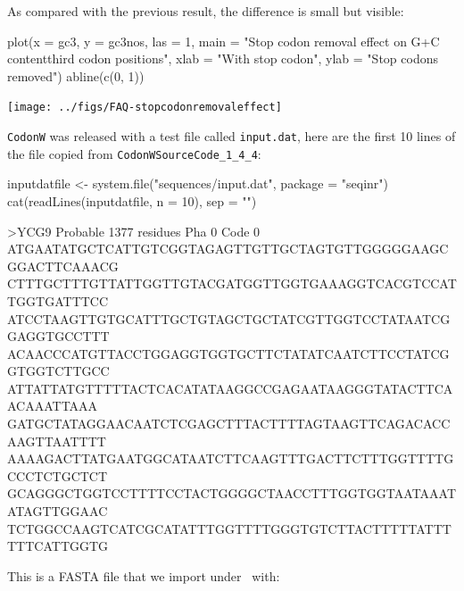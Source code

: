 \documentclass{article}
\begin{document}
As compared with the previous result, the difference is small but visible:

\begin{Schunk}
\begin{Sinput}
 plot(x = gc3, y = gc3nos, las = 1, main = "Stop codon removal effect on G+C content\nin third codon positions", 
     xlab = "With stop codon", ylab = "Stop codons removed")
 abline(c(0, 1))
\end{Sinput}
\end{Schunk}
\texttt{[image: ../figs/FAQ-stopcodonremovaleffect]}

\texttt{CodonW} was released with a test file called \texttt{input.dat}, here are
the first 10 lines of the file copied from \texttt{CodonWSourceCode\_1\_4\_4}:

\begin{Schunk}
\begin{Sinput}
 inputdatfile <- system.file("sequences/input.dat", package = "seqinr")
 cat(readLines(inputdatfile, n = 10), sep = "\n")
\end{Sinput}
\begin{Soutput}
>YCG9 Probable          1377 residues Pha 0 Code 0
ATGAATATGCTCATTGTCGGTAGAGTTGTTGCTAGTGTTGGGGGAAGCGGACTTCAAACG
CTTTGCTTTGTTATTGGTTGTACGATGGTTGGTGAAAGGTCACGTCCATTGGTGATTTCC
ATCCTAAGTTGTGCATTTGCTGTAGCTGCTATCGTTGGTCCTATAATCGGAGGTGCCTTT
ACAACCCATGTTACCTGGAGGTGGTGCTTCTATATCAATCTTCCTATCGGTGGTCTTGCC
ATTATTATGTTTTTACTCACATATAAGGCCGAGAATAAGGGTATACTTCAACAAATTAAA
GATGCTATAGGAACAATCTCGAGCTTTACTTTTAGTAAGTTCAGACACCAAGTTAATTTT
AAAAGACTTATGAATGGCATAATCTTCAAGTTTGACTTCTTTGGTTTTGCCCTCTGCTCT
GCAGGGCTGGTCCTTTTCCTACTGGGGCTAACCTTTGGTGGTAATAAATATAGTTGGAAC
TCTGGCCAAGTCATCGCATATTTGGTTTTGGGTGTCTTACTTTTTATTTTTTCATTGGTG
\end{Soutput}
\end{Schunk}

This is a FASTA file that we import under \Rlogo{}~with:
\end{document}
